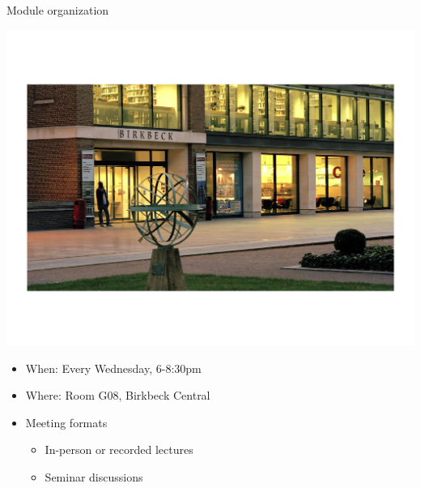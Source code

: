 \documentclass[
  10pt,
  ignorenonframetext,
]{beamer}
\begin{document}
\begin{frame}{Module organization}
\protect\hypertarget{module-organization}{}
\vspace{0.2cm}

\begin{center}\includegraphics[width=0.8\linewidth]{Figs/bbk_night} \end{center}
\vspace{0.3cm}
\begin{itemize}
\small
  \item When: Every Wednesday, 6-8:30pm
  \item Where: Room G08, Birkbeck Central
  \item Meeting formats
  \begin{itemize}
    \item In-person or recorded lectures
    \item Seminar discussions
  \end{itemize}
\end{itemize}
\end{frame}
\end{document}
